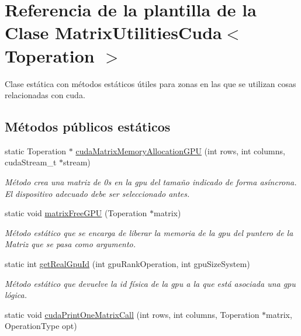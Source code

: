 \hypertarget{classMatrixUtilitiesCuda}{}\section{Referencia de la plantilla de la Clase Matrix\+Utilities\+Cuda$<$ Toperation $>$}
\label{classMatrixUtilitiesCuda}


Clase estática con métodos estáticos útiles para zonas en las que se utilizan cosas relacionadas con cuda.  


\subsection*{Métodos públicos estáticos}
\begin{DoxyCompactItemize}
\item 
static Toperation $\ast$ \hyperlink{classMatrixUtilitiesCuda_a2d58e958017dc6a8ee276424e04181cf}{cuda\+Matrix\+Memory\+Allocation\+G\+PU} (int rows, int columns, cuda\+Stream\+\_\+t $\ast$stream)
\begin{DoxyCompactList}\small\item\em Método crea una matriz de 0s en la gpu del tamaño indicado de forma asíncrona. El dispositivo adecuado debe ser seleccionado antes. \end{DoxyCompactList}\item 
static void \hyperlink{classMatrixUtilitiesCuda_adcb5062c6eb05a5aa2fdecaf31cab16a}{matrix\+Free\+G\+PU} (Toperation $\ast$matrix)
\begin{DoxyCompactList}\small\item\em Método estático que se encarga de liberar la memoria de la gpu del puntero de la Matriz que se pasa como argumento. \end{DoxyCompactList}\item 
static int \hyperlink{classMatrixUtilitiesCuda_acff60b8f1f2e61b72ef08535fc623998}{get\+Real\+Gpu\+Id} (int gpu\+Rank\+Operation, int gpu\+Size\+System)
\begin{DoxyCompactList}\small\item\em Método estático que devuelve la id física de la gpu a la que está asociada una gpu lógica. \end{DoxyCompactList}\item 
static void \hyperlink{classMatrixUtilitiesCuda_a5e71d3c1d742db1b2b9d1543cdc403cc}{cuda\+Print\+One\+Matrix\+Call} (int rows, int columns, Toperation $\ast$matrix, Operation\+Type opt)

\end{DoxyCompactItemize}
